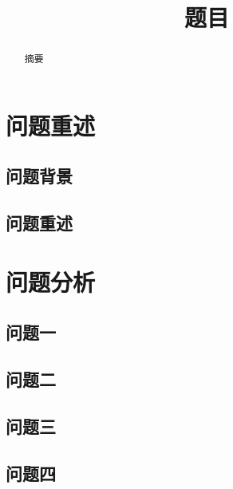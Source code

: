 \documentclass[withoutpreface,bwprint]{cumcmthesis} %
\title{题目}
\begin{document}
    
    \maketitle
    \begin{abstract}
        
        摘要
        
        
        
    \end{abstract}
    
    
    
    \section{问题重述}
    
    \subsection{问题背景}
    

    
    \subsection{问题重述}
    

    
    \section{问题分析}
    
    \subsection{问题一}
    

    
    \subsection{问题二}
    

    
    \subsection{问题三}
    

    
    \subsection{问题四}
    
\end{document}
